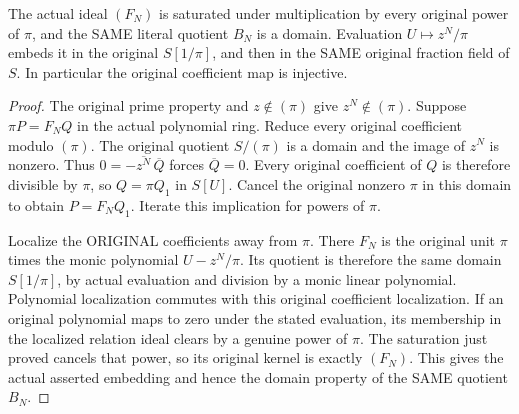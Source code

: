 \begin{lemma}
\label{lem:gauss-regular-surface-chart-domain}
\leanok
The actual ideal $(F_N)$ is saturated under multiplication by every original
power of $\pi$, and the SAME literal quotient $B_N$ is a domain. Evaluation
$U\mapsto z^N/\pi$ embeds it in the original $S[1/\pi]$, and then in the SAME
original fraction field of $S$. In particular the original coefficient map
is injective.
\end{lemma}
\begin{proof}
The original prime property and $z\notin(\pi)$ give $z^N\notin(\pi)$.
Suppose $\pi P=F_NQ$ in the actual polynomial ring. Reduce every original
coefficient modulo $(\pi)$. The original quotient $S/(\pi)$ is a domain and
the image of $z^N$ is nonzero. Thus $0=-\overline{z^N}\,\overline Q$ forces
$\overline Q=0$. Every original coefficient of $Q$ is therefore divisible by
$\pi$, so $Q=\pi Q_1$ in $S[U]$. Cancel the original nonzero $\pi$ in this
domain to obtain $P=F_NQ_1$. Iterate this implication for powers of $\pi$.

Localize the ORIGINAL coefficients away from $\pi$. There $F_N$ is the
original unit $\pi$ times the monic polynomial $U-z^N/\pi$. Its quotient is
therefore the same domain $S[1/\pi]$, by actual evaluation and division by a
monic linear polynomial. Polynomial localization commutes with this original
coefficient localization. If an original polynomial maps to zero under the
stated evaluation, its membership in the localized relation ideal clears
by a genuine power of $\pi$. The saturation just proved cancels that power,
so its original kernel is exactly $(F_N)$. This gives the actual asserted
embedding and hence the domain property of the SAME quotient $B_N$.
\end{proof}

